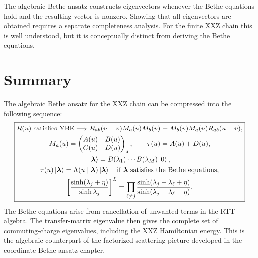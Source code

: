 \begin{remark}
The algebraic Bethe ansatz constructs eigenvectors whenever the Bethe equations
hold and the resulting vector is nonzero.  Showing that all eigenvectors are
obtained requires a separate completeness analysis.  For the finite XXZ chain
this is well understood, but it is conceptually distinct from deriving the Bethe
equations.
\end{remark}

\section{Summary}
\label{sec:aba-summary}

The algebraic Bethe ansatz for the XXZ chain can be compressed into the following
sequence:
\begin{equation}
\label{eq:aba-summary-chain}
\boxed{
\begin{gathered}
    R(u)\text{ satisfies YBE}
    \Longrightarrow
    R_{ab}(u-v)M_a(u)M_b(v)=M_b(v)M_a(u)R_{ab}(u-v),
    \\
    M_a(u)=
    \begin{pmatrix}A(u)&B(u)\\ C(u)&D(u)\end{pmatrix}_a,
    \qquad
    \tau(u)=A(u)+D(u),
    \\
    \left|\boldsymbol{\lambda}\right\rangle
    =B(\lambda_1)\cdots B(\lambda_M)\left|0\right\rangle,
    \\
    \tau(u)\left|\boldsymbol{\lambda}\right\rangle
    =\Lambda(u\mid\boldsymbol{\lambda})\left|\boldsymbol{\lambda}\right\rangle
    \quad
    \text{if }\boldsymbol{\lambda}\text{ satisfies the Bethe equations},
    \\
    \left[
    \frac{\sinh(\lambda_j+\eta)}{\sinh\lambda_j}
    \right]^L
    =
    \prod_{\ell\neq j}
    \frac{\sinh(\lambda_j-\lambda_\ell+\eta)}
         {\sinh(\lambda_j-\lambda_\ell-\eta)} .
\end{gathered}}
\end{equation}
The Bethe equations arise from cancellation of unwanted terms in the RTT algebra.
The transfer-matrix eigenvalue then gives the complete set of commuting-charge
eigenvalues, including the XXZ Hamiltonian energy.  This is the algebraic
counterpart of the factorized scattering picture developed in the coordinate
Bethe-ansatz chapter.

